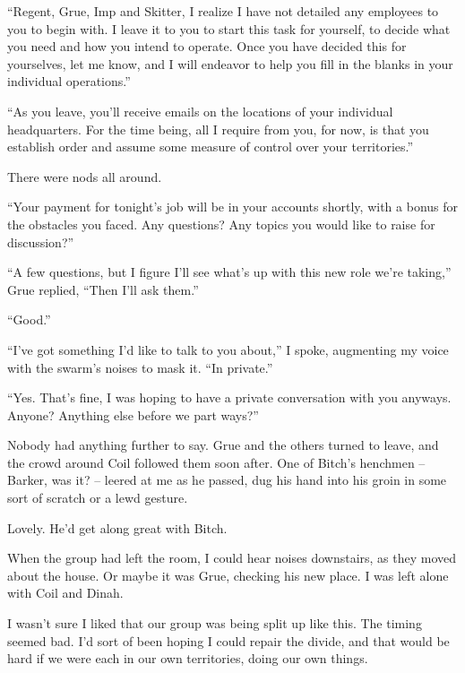 ``Regent, Grue, Imp and Skitter, I realize I have not detailed any employees to you to begin with.  I leave it to you to start this task for yourself, to decide what you need and how you intend to operate.  Once you have decided this for yourselves, let me know, and I will endeavor to help you fill in the blanks in your individual operations.''



``As you leave, you'll receive emails on the locations of your individual headquarters.  For the time being, all I require from you, for now, is that you establish order and assume some measure of control over your territories.''



There were nods all around.



``Your payment for tonight's job will be in your accounts shortly, with a bonus for the obstacles you faced.  Any questions?  Any topics you would like to raise for discussion?''



``A few questions, but I figure I'll see what's up with this new role we're taking,'' Grue replied, ``Then I'll ask them.''



``Good.''



``I've got something I'd like to talk to you about,'' I spoke, augmenting my voice with the swarm's noises to mask it.  ``In private.''



``Yes.  That's fine, I was hoping to have a private conversation with you anyways.  Anyone?  Anything else before we part ways?''



Nobody had anything further to say.  Grue and the others turned to leave, and the crowd around Coil followed them soon after.  One of Bitch's henchmen – Barker, was it? – leered at me as he passed, dug his hand into his groin in some sort of scratch or a lewd gesture.



Lovely.  He'd get along great with Bitch.



When the group had left the room, I could hear noises downstairs, as they moved about the house.  Or maybe it was Grue, checking his new place.  I was left alone with Coil and Dinah.



I wasn't sure I liked that our group was being split up like this.  The timing seemed bad.  I'd sort of been hoping I could repair the divide, and that would be hard if we were each in our own territories, doing our own things.



